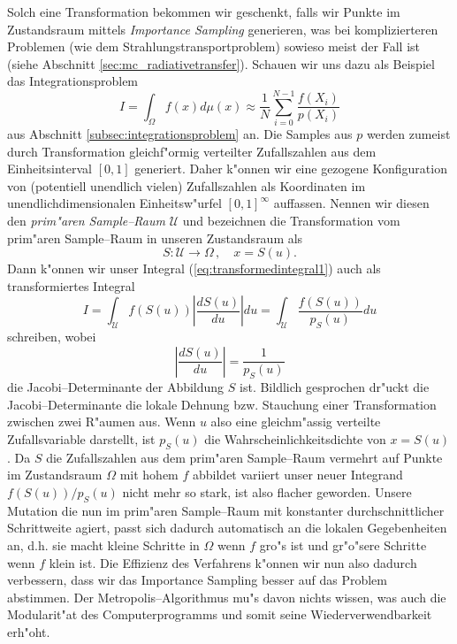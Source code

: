 	Solch eine Transformation bekommen wir geschenkt, falls wir Punkte im Zustandsraum mittels {\em Importance Sampling} generieren, was bei komplizierteren Problemen (wie dem Strahlungstransportproblem) sowieso meist der Fall ist (siehe Abschnitt \ref{sec:mc_radiativetransfer}). Schauen wir uns dazu als Beispiel das Integrationsproblem
	\begin{equation}
		I=\int_\Omega f(x) d\mu(x)\approx \frac{1}{N}\sum_{i=0}^{N-1} \frac{f(X_i)}{p(X_i)}
		\label{eq:transformedintegral1}
	\end{equation}
	aus Abschnitt \ref{subsec:integrationsproblem} an. Die Samples aus $p$ werden zumeist durch Transformation gleichf"ormig verteilter Zufallszahlen aus dem Einheitsinterval $[0,1]$ generiert. Daher k"onnen wir eine gezogene Konfiguration von (potentiell unendlich vielen) Zufallszahlen als Koordinaten im unendlichdimensionalen Einheitsw"urfel $[0,1]^\infty$ auffassen. Nennen wir diesen den {\em prim"aren Sample--Raum} $\mathcal{U}$ und bezeichnen die Transformation vom prim"aren Sample--Raum in unseren Zustandsraum als
	$$S : \mathcal{U} \to \Omega\,,\quad x=S(u).$$
	Dann k"onnen wir unser Integral (\ref{eq:transformedintegral1}) auch als transformiertes Integral
	$$I=\int_\mathcal{U} f(S(u)) \left|\frac{dS(u)}{du}\right|du=\int_\mathcal{U} \frac{f(S(u))}{p_S(u)}du$$
	schreiben, wobei
	$$\left|\frac{dS(u)}{du}\right|=\frac{1}{p_S(u)}$$
	die Jacobi--Determinante der Abbildung $S$ ist. Bildlich gesprochen dr"uckt die Jacobi--Determinante die lokale Dehnung bzw. Stauchung einer Transformation zwischen zwei R"aumen aus. Wenn $u$ also eine gleichm"assig verteilte Zufallsvariable darstellt, ist $p_S(u)$ die Wahrscheinlichkeitsdichte von $x=S(u)$. Da $S$ die Zufallszahlen aus dem prim"aren Sample--Raum vermehrt auf Punkte im Zustandsraum $\Omega$ mit hohem $f$ abbildet variiert unser neuer Integrand $f(S(u))/p_S(u)$ nicht mehr so stark, ist also flacher geworden. Unsere Mutation die nun im prim"aren Sample--Raum mit konstanter durchschnittlicher Schrittweite agiert, passt sich dadurch automatisch an die lokalen Gegebenheiten an, d.h. sie macht kleine Schritte in $\Omega$ wenn $f$ gro"s ist und gr"o"sere Schritte wenn $f$ klein ist. Die Effizienz des Verfahrens k"onnen wir nun also dadurch verbessern, dass wir das Importance Sampling besser auf das Problem abstimmen. Der Metropolis--Algorithmus mu"s davon nichts wissen, was auch die Modularit"at des Computerprogramms und somit seine Wiederverwendbarkeit erh"oht.

